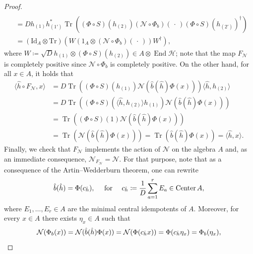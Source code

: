 \documentclass[a4paper,10pt]{amsart}
\newcommand{\Noisy}{\mathcal{N}}
\newcommand{\eval}[2]{\langle #1 , #2\rangle}
\newcommand{\placeholder}{\,\cdot\,}
\theoremstyle{definition}
\begin{document}
\begin{proof}
\begin{align}
		\\ &
        =
        D h_{(1)} h_{(1')}^*
        \operatorname{Tr}((\Phi\circ S)(h_{(2)}) (\Noisy\circ \Phi_b)(\placeholder)(\Phi\circ S)(h_{(2')})^\dagger)
		\\ &
        =
        (\mathrm{Id}_A\otimes\mathrm{Tr})(W  (1_A \otimes (\Noisy\circ \Phi_b)(\placeholder))  W^\dagger),
	\end{align}
	where $W \coloneqq \sqrt{D} h_{(1)}\otimes (\Phi\circ S)(h_{(2)}) \in A \otimes \operatorname{End}\mathscr{H}$; note that the map $F_{\Noisy}$ is comple\-te\-ly po\-si\-tive since $\Noisy\circ \Phi_b$ is completely positive. On the other hand, for all $x\in A$, it holds that
	\begin{align}
		\eval{\hat{h}\circ F_{\Noisy}}{x}
        & =
        D
        \operatorname{Tr}((\Phi\circ S)(h_{(1)}) \Noisy(\hat{b}(\hat{h}) \Phi(x)))
        \eval{\hat{h}}{h_{(2)}}
		\\ &
        =
        D
        \operatorname{Tr}((\Phi\circ S)(\eval{\hat{h}}{h_{(2)}} h_{(1)})
        \Noisy(\hat{b}(\hat{h}) \Phi(x)))
		\\ &
        =
        \operatorname{Tr}((\Phi\circ S)(1) \Noisy(\hat{b}(\hat{h}) \Phi(x))) 
        \\ &
        =
        \operatorname{Tr}(\Noisy(\hat{b}(\hat{h}) \Phi(x)))
        =
        \operatorname{Tr}(\hat{b}(\hat{h}) \Phi(x))
        =
        \eval{\hat{h}}{x}.
	\end{align}
	Finally, we check that $F_{\Noisy}$ implements the action of $\Noisy$ on the algebra $A$ and, as an immediate consequence, $\Noisy_{F_{\Noisy}} = \Noisy$. For that purpose, note that as a consequence of the Artin--Wedderburn theorem, one can rewrite
	\begin{equation}
		\hat{b}(\hat{h})
        =
        \Phi(c_{\smash{\hat{h}}}),
        \quad\text{ for }\quad
        c_{\smash{\hat{h}}}
        \coloneqq
        \frac{1}{D} \sum_{a=1}^r E_a
        \in \operatorname{Center}A,
	\end{equation}
	where $E_1,\ldots,E_r\in A$ are the minimal central idempotents of $A$.
    Moreover, for every $x\in A$ there exists $\eta_x\in A$ such that
	\begin{equation}
		\Noisy(\Phi_b(x))
        =
        \Noisy(\hat{b}(\hat{h})\Phi(x))
        =
        \Noisy(\Phi(c_{\smash{\hat{h}}}x))
        =
        \Phi(c_{\smash{\hat{h}}} \eta_x)
        =
        \Phi_b(\eta_x),
	\end{equation}

\end{proof}
\end{document}

